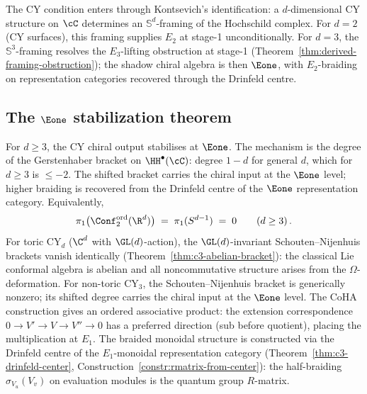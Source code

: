 The CY condition enters through Kontsevich's identification: a
$d$-dimensional CY structure on $\cC$ determines an
$\mathbb{S}^d$-framing of the Hochschild complex. For $d = 2$
(CY surfaces), this framing supplies $E_2$ at stage-1
unconditionally. For $d = 3$, the $\mathbb{S}^3$-framing
resolves the $E_3$-lifting obstruction at stage-1
(Theorem~\ref{thm:derived-framing-obstruction}); the shadow
chiral algebra is then $\Eone$, with $E_2$-braiding on
representation categories recovered through the Drinfeld centre.

\subsection{The \texorpdfstring{$\Eone$}{E1} stabilization theorem}
\label{subsec:e1-stabilization-intro}

For $d \geq 3$, the CY chiral output stabilises at $\Eone$. The
mechanism is the degree of the Gerstenhaber bracket on
$\HH^\bullet(\cC)$: degree $1 - d$ for general $d$, which for
$d \geq 3$ is $\leq -2$. The shifted bracket carries the chiral
input at the $\Eone$ level; higher braiding is recovered from the
Drinfeld centre of the $\Eone$ representation category.
Equivalently,
\[
 \pi_1\bigl(\Conf_2^{\mathrm{ord}}(\R^d)\bigr)
 \;=\; \pi_1(S^{d-1}) \;=\; 0
 \qquad (d \geq 3)\,.
\]
For toric CY$_d$ ($\C^d$ with $\GL(d)$-action), the
$\GL(d)$-invariant Schouten--Nijenhuis brackets vanish
identically (Theorem~\ref{thm:c3-abelian-bracket}): the
classical Lie conformal algebra is abelian and all
noncommutative structure arises from the $\Omega$-deformation.
For non-toric CY$_3$, the Schouten--Nijenhuis bracket is
generically nonzero; its shifted degree carries the chiral input at
the $\Eone$ level. The CoHA construction gives an ordered
associative product: the extension correspondence
$0 \to V' \to V \to V'' \to 0$ has a preferred direction
(sub before quotient), placing the multiplication at $E_1$. The braided
monoidal structure is constructed via the Drinfeld centre of
the $E_1$-monoidal representation category
(Theorem~\ref{thm:c3-drinfeld-center},
Construction~\ref{constr:rmatrix-from-center}): the half-braiding
$\sigma_{V_u}(V_v)$ on evaluation modules is the quantum group
$R$-matrix.


